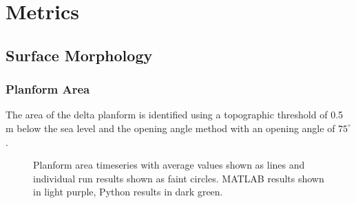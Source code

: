 \documentclass[a4paper]{article}
\begin{document}
\section{Metrics}

\subsection{Surface Morphology}

\subsubsection{Planform Area}
The area of the delta planform is identified using a topographic threshold of 0.5 m below the sea level \cite{Liang2016a,Liang2016} and the opening angle method \cite{Shaw2008} with an opening angle of $75^{\circ}$.

\begin{figure}[!ht]
	\caption{Planform area timeseries with average values shown as lines and individual run results shown as faint circles. MATLAB results shown in light purple, Python results in dark green.}
	\label{fig:area}
\end{figure}
\end{document}
